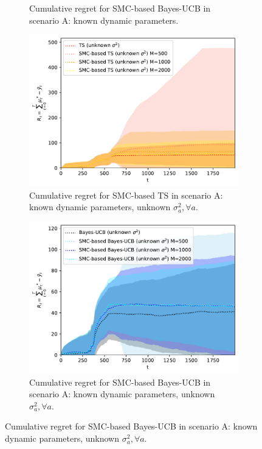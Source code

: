\begin{figure}[!h]
\begin{subfigure}[b]{0.45\textwidth}
		\caption{Cumulative regret for SMC-based Bayes-UCB in scenario A: known dynamic parameters.}
		\label{fig:dynamic_bandits_linearGaussian_a_bucb_dknown_knownsigma_M}
	\end{subfigure}
	
	\begin{subfigure}[b]{0.45\textwidth}
		\includegraphics[width=\textwidth]{./fods_figs/dynamic/linearGaussian/a_selectedM_cumulative_regret_dknown_ts_unknownsigma}
		\caption{Cumulative regret for SMC-based TS in scenario A: known dynamic parameters, unknown $\sigma_a^2, \forall a$.}
		\label{fig:dynamic_bandits_linearGaussian_a_ts_dknown_unknownsigma_M}
	\end{subfigure}\qquad
	\begin{subfigure}[b]{0.45\textwidth}
		\includegraphics[width=\textwidth]{./fods_figs/dynamic/linearGaussian/a_selectedM_cumulative_regret_dknown_bucb_unknownsigma}
		\caption{Cumulative regret for SMC-based Bayes-UCB in scenario A: known dynamic parameters, unknown $\sigma_a^2, \forall a$.}
		\label{fig:dynamic_bandits_linearGaussian_a_bucb_dknown_unknownsigma_M}
	\end{subfigure}
	

\end{figure}
